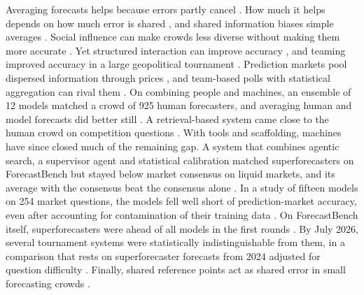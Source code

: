 \documentclass[11pt,a4paper]{article}
\theoremstyle{definition}
\begin{document}
Averaging forecasts helps because errors partly cancel \citep{galton1907vox,bates1969combination,clemen1989combining}. How much it helps depends on how much error is shared \citep{davisstober2014crowd}, and shared information biases simple averages \citep{palley2019extracting}. Social influence can make crowds less diverse without making them more accurate \citep{lorenz2011social}. Yet structured interaction can improve accuracy \citep{becker2017network}, and teaming improved accuracy in a large geopolitical tournament \citep{mellers2014psychological}. Prediction markets pool dispersed information through prices \citep{hayek1945use,wolfers2004prediction}, and team-based polls with statistical aggregation can rival them \citep{atanasov2017distilling}. On combining people and machines, an ensemble of 12 models matched a crowd of 925 human forecasters, and averaging human and model forecasts did better still \citep{schoenegger2024wisdom}. A retrieval-based system came close to the human crowd on competition questions \citep{halawi2024approaching}. With tools and scaffolding, machines have since closed much of the remaining gap. A system that combines agentic search, a supervisor agent and statistical calibration matched superforecasters on ForecastBench but stayed below market consensus on liquid markets, and its average with the consensus beat the consensus alone \citep{alur2025aia}. In a study of fifteen models on 254 market questions, the models fell well short of prediction-market accuracy, even after accounting for contamination of their training data \citep{douven2026wisdom}. On ForecastBench itself, superforecasters were ahead of all models in the first rounds \citep{karger2025forecastbench}. By July 2026, several tournament systems were statistically indistinguishable from them, in a comparison that rests on superforecaster forecasts from 2024 adjusted for question difficulty \citep{fri2026parity}. Finally, shared reference points act as shared error in small forecasting crowds \citep{wallmeier2026whom}.
\end{document}
